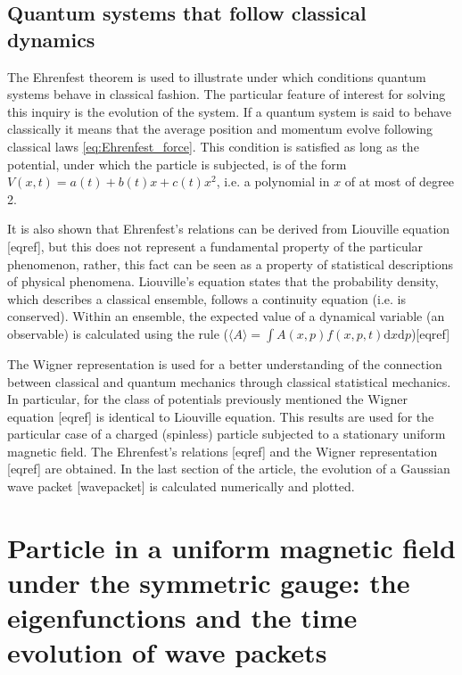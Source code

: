 \subsection*{Quantum systems that follow classical dynamics \cite{manfrediQuantumSystemsThat1993}}

The Ehrenfest theorem is used to illustrate under which conditions quantum systems behave in classical fashion. The particular feature of interest for solving this inquiry is the evolution of the system. If a quantum system is said to behave classically it means that the average position and momentum evolve following classical laws \eqref{eq:Ehrenfest_force}. This condition is satisfied as long as the potential, under which the particle is subjected, is of the form $V(x, t) = a(t) + b(t)x + c(t)x^2$, i.e. a polynomial in $x$ of at most of degree 2.

It is also shown that Ehrenfest’s relations can be derived from Liouville equation [eqref], but this does not represent a fundamental property of the particular phenomenon, rather, this fact can be seen as a property of statistical descriptions of physical phenomena. Liouville's equation states that the probability density, which describes a classical ensemble, follows a continuity equation (i.e. is conserved). Within an ensemble, the expected value of a dynamical variable (an observable) is calculated using the rule ($\langle A \rangle = \int A (x, p) f(x, p, t)\text{d}x\text{d}p$)[eqref]

The Wigner representation is used for a better understanding of the connection between classical and quantum mechanics through classical statistical mechanics. In particular, for the class of potentials previously mentioned the Wigner equation [eqref] is identical to Liouville equation. This results are used for the particular case of a charged (spinless) particle subjected to a stationary uniform magnetic field. The Ehrenfest’s relations [eqref] and the Wigner representation [eqref] are obtained. In the last section of the article, the evolution of a Gaussian wave packet [wavepacket] is calculated numerically and plotted.

\section*{Particle in a uniform magnetic field under the symmetric gauge: the eigenfunctions and the time evolution of wave packets \cite{britoParticleUniformMagnetic2007}}

